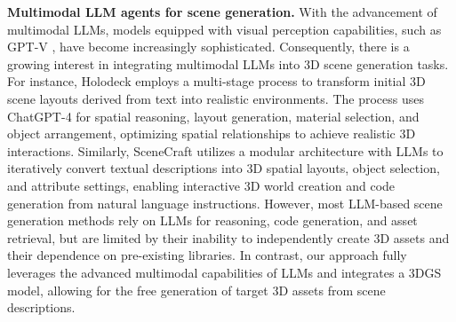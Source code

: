 \textbf{Multimodal LLM agents for scene generation.} With the advancement of multimodal LLMs, models equipped with visual perception capabilities, such as GPT-V \citep{openai2023gpt4v}, have become increasingly sophisticated. Consequently, there is a growing interest in integrating multimodal LLMs into 3D scene generation tasks. For instance, Holodeck \citep{Holodeck} employs a multi-stage process to transform initial 3D scene layouts derived from text into realistic environments. The process uses ChatGPT-4 \citep{openai2023gpt4v} for spatial reasoning, layout generation, material selection, and object arrangement, optimizing spatial relationships to achieve realistic 3D interactions. Similarly, SceneCraft \citep{SCENECRAFT} utilizes a modular architecture with LLMs to iteratively convert textual descriptions into 3D spatial layouts, object selection, and attribute settings, enabling interactive 3D world creation and code generation from natural language instructions. However, most LLM-based scene generation methods rely on LLMs for reasoning, code generation, and asset retrieval, but are limited by their inability to independently create 3D assets and their dependence on pre-existing libraries. In contrast, our approach fully leverages the advanced multimodal capabilities of LLMs and integrates a 3DGS model, allowing for the free generation of target 3D assets from scene descriptions.